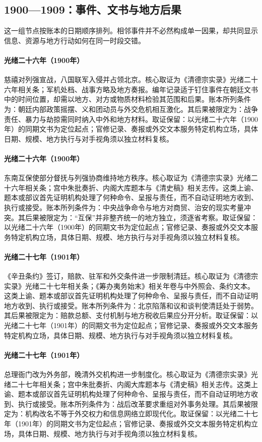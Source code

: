 \subsection{1900—1909：事件、文书与地方后果}
这一组节点按账本的日期顺序排列。相邻事件并不必然构成单一因果，却共同显示信息、资源与地方行动如何在同一时段交错。
\hypertarget{ledger:EQ-1900-BOXER-WAR}{}\paragraph{光绪二十六年（1900年）}慈禧对列强宣战，八国联军入侵并占领北京。核心取证为《清德宗实录》光绪二十六年相关条；军机处档、战事方略及地方奏报。编年记录适于钉住事件在朝廷文书中的时间位置，却需以地方、对方或物质材料检验其范围和后果。账本所列条件为：朝廷内部政策摇摆、义和团动员与外交危机相互激化。其后果被限定为：战争责任、暴力与劫掠需同时纳入中外和地方材料。取证保留：以光绪二十六年（1900年）的同期文书为定位起点；官修记录、奏报或外交文本服务特定机构立场，具体日期、规模、地方执行与对手视角须以独立材料复核。
\hypertarget{ledger:EQ-1900-SOUTHEAST-MUTUAL-PROTECTION}{}\paragraph{光绪二十六年（1900年）}东南互保使部分督抚与列强协商维持地方秩序。核心取证为《清德宗实录》光绪二十六年相关条；宫中朱批奏折、内阁大库题本与《清史稿》相关志传。这类上谕、题本或部议首先证明机构处理了何种命令、呈报与责任，而不自动证明地方收到、执行或接受。账本所列条件为：中央战争命令与地方对商贸、治安的现实考量冲突。其后果被限定为：“互保”并非整齐统一的地方独立，须逐省考察。取证保留：以光绪二十六年（1900年）的同期文书为定位起点；官修记录、奏报或外交文本服务特定机构立场，具体日期、规模、地方执行与对手视角须以独立材料复核。
\hypertarget{ledger:EQ-1901-BOXER-PROTOCOL}{}\paragraph{光绪二十七年（1901年）}《辛丑条约》签订，赔款、驻军和外交条件进一步限制清廷。核心取证为《清德宗实录》光绪二十七年相关条；《筹办夷务始末》相关年卷与中外照会、条约文本。这类上谕、题本或部议首先证明机构处理了何种命令、呈报与责任，而不自动证明地方收到、执行或接受。账本所列条件为：北京陷落和议和谈判使清廷处于弱势。其后果被限定为：赔款总额、支付机制与地方税收后果应分开分析。取证保留：以光绪二十七年（1901年）的同期文书为定位起点；官修记录、奏报或外交文本服务特定机构立场，具体日期、规模、地方执行与对手视角须以独立材料复核。
\hypertarget{ledger:EQ-1901-ZONGLI-YAMEN-REPLACED}{}\paragraph{光绪二十七年（1901年）}总理衙门改为外务部，晚清外交机构进一步制度化。核心取证为《清德宗实录》光绪二十七年相关条；宫中朱批奏折、内阁大库题本与《清史稿》相关志传。这类上谕、题本或部议首先证明机构处理了何种命令、呈报与责任，而不自动证明地方收到、执行或接受。账本所列条件为：战后改革要求重组对外事务处理。其后果被限定为：机构改名不等于外交权力和信息网络立即现代化。取证保留：以光绪二十七年（1901年）的同期文书为定位起点；官修记录、奏报或外交文本服务特定机构立场，具体日期、规模、地方执行与对手视角须以独立材料复核。
